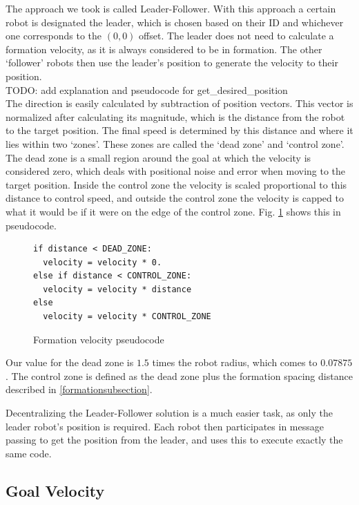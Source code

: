 \documentclass[letterpaper, 10 pt, conference]{ieeeconf}  %
\begin{document}
The approach we took is called Leader-Follower. With this approach a certain robot is designated the leader, which is chosen based on their ID and whichever one corresponds to the $(0,0)$ offset. The leader does not need to calculate a formation velocity, as it is always considered to be in formation. The other `follower' robots then use the leader's position to generate the velocity to their position. \\

TODO: add explanation and pseudocode for get\_desired\_position \\

The direction is easily calculated by subtraction of position vectors. This vector is normalized after calculating its magnitude, which is the distance from the robot to the target position. The final speed is determined by this distance and where it lies within two `zones'. These zones are called the `dead zone' and `control zone'. The dead zone is a small region around the goal at which the velocity is considered zero, which deals with positional noise and error when moving to the target position. Inside the control zone the velocity is scaled proportional to this distance to control speed, and outside the control zone the velocity is capped to what it would be if it were on the edge of the control zone. Fig. \ref{zonecode} shows this in pseudocode.

\begin{figure}[thpb]
\centering
\lstset{language=python}
\begin{lstlisting}
if distance < DEAD_ZONE:
  velocity = velocity * 0.
else if distance < CONTROL_ZONE:
  velocity = velocity * distance
else
  velocity = velocity * CONTROL_ZONE
\end{lstlisting}
\caption{Formation velocity pseudocode}
\label{zonecode}
\end{figure}

Our value for the dead zone is $1.5$ times the robot radius, which comes to $0.07875$. The control zone is defined as the dead zone plus the formation spacing distance described in \ref{formationsubsection}.

Decentralizing the Leader-Follower solution is a much easier task, as only the leader robot's position is required. Each robot then participates in message passing to get the position from the leader, and uses this to execute exactly the same code.

\subsection{Goal Velocity}
\end{document}
